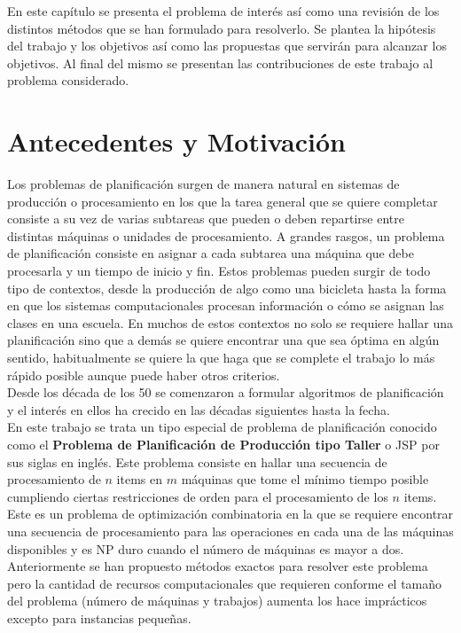 En este capítulo se presenta el problema de interés así como una revisión de los distintos métodos que se han formulado para resolverlo. Se plantea la hipótesis del trabajo y los objetivos así como las propuestas que servirán para alcanzar los objetivos. Al final del mismo se presentan las contribuciones de este trabajo al problema considerado.
\section{Antecedentes y Motivación}
Los problemas de planificación surgen de manera natural en sistemas de producción o procesamiento en los que la tarea general que se quiere completar consiste a su vez de varias subtareas que pueden o deben repartirse entre distintas máquinas o unidades de procesamiento. A grandes rasgos, un problema de planificación consiste en asignar a cada subtarea una máquina que debe procesarla y un tiempo de inicio y fin.  Estos problemas pueden surgir de todo tipo de contextos, desde la producción de algo como una bicicleta hasta la forma en que los sistemas computacionales procesan información o cómo se asignan las clases en una escuela. En muchos de estos contextos no solo se requiere hallar una planificación sino que a demás se quiere encontrar una que sea óptima en algún sentido, habitualmente se quiere la que haga que se complete el trabajo lo más rápido posible aunque puede haber otros criterios.\\
Desde los década de los 50 se comenzaron a formular algoritmos de planificación\cite{johnson1954optimal} y el interés en ellos ha crecido en las décadas siguientes hasta la fecha.\\ 
 
En este trabajo se trata un tipo especial de problema de planificación conocido como el \textbf{Problema de Planificación de Producción tipo Taller} o JSP por sus siglas en inglés. Este problema consiste en hallar una secuencia de procesamiento de $n$ items en $m$ máquinas que tome el mínimo tiempo posible cumpliendo ciertas restricciones de orden para el procesamiento de los $n$ items. Este es un problema de optimización combinatoria en la que se requiere encontrar una secuencia de procesamiento para las operaciones en cada una de las máquinas disponibles y es NP duro cuando el número de máquinas es mayor a dos.\\

Anteriormente se han propuesto métodos exactos para resolver este problema \cite{Brucker1994} pero la cantidad de recursos computacionales que requieren conforme el tamaño del problema (número de máquinas y trabajos) aumenta los hace imprácticos excepto para instancias pequeñas.


